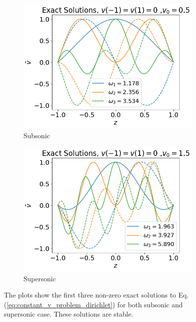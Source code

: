 \begin{figure}[H]
	\centering
	\begin{subfigure}{0.5\textwidth}
		\includegraphics[width=\linewidth]{img/theoretical_analysis/exact_fixed_fixed_v0=0.5}
		\caption{Subsonic}
	\end{subfigure}%
	\begin{subfigure}{0.5\textwidth}
		\includegraphics[width=\linewidth]{img/theoretical_analysis/exact_fixed_fixed_v0=1.5}
		\caption{Supersonic}
	\end{subfigure}
	\caption{The plots show the first three non-zero exact solutions to Eq.(\ref{eq:constant_v_problem_dirichlet}) for both subsonic and supersonic case. These solutions are stable.}
	\label{fig:exact_v_dirichlet}
\end{figure}

